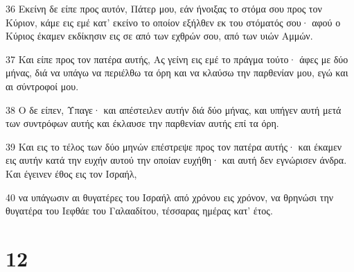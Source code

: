\par 36 Εκείνη δε είπε προς αυτόν, Πάτερ μου, εάν ήνοιξας το στόμα σου προς τον Κύριον, κάμε εις εμέ κατ' εκείνο το οποίον εξήλθεν εκ του στόματός σου· αφού ο Κύριος έκαμεν εκδίκησιν εις σε από των εχθρών σου, από των υιών Αμμών.
\par 37 Και είπε προς τον πατέρα αυτής, Ας γείνη εις εμέ το πράγμα τούτο· άφες με δύο μήνας, διά να υπάγω να περιέλθω τα όρη και να κλαύσω την παρθενίαν μου, εγώ και αι σύντροφοί μου.
\par 38 Ο δε είπεν, Υπαγε· και απέστειλεν αυτήν διά δύο μήνας, και υπήγεν αυτή μετά των συντρόφων αυτής και έκλαυσε την παρθενίαν αυτής επί τα όρη.
\par 39 Και εις το τέλος των δύο μηνών επέστρεψε προς τον πατέρα αυτής· και έκαμεν εις αυτήν κατά την ευχήν αυτού την οποίαν ευχήθη· και αυτή δεν εγνώρισεν άνδρα. Και έγεινεν έθος εις τον Ισραήλ,
\par 40 να υπάγωσιν αι θυγατέρες του Ισραήλ από χρόνου εις χρόνον, να θρηνώσι την θυγατέρα του Ιεφθάε του Γαλααδίτου, τέσσαρας ημέρας κατ' έτος.

\chapter{12}

